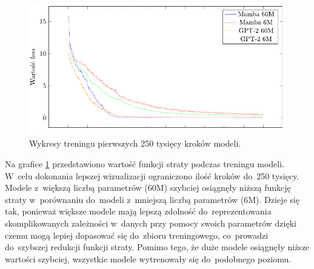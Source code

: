 \documentclass[data-science]{agh-wi} %
\begin{document}
\begin{figure}[ht!]
    \centering
    \includegraphics[width=0.9\linewidth]{./img/training_plot.pdf}
    \caption{Wykresy treningu pierwszych 250 tysięcy kroków modeli.}\label{fig:midi_train}
\end{figure}

Na grafice \ref*{fig:midi_train} przedstawiono wartość funkcji straty podczas treningu modeli. W~celu dokonania lepszej wizualizacji ograniczono ilość kroków do~250 tysięcy. Modele z~większą liczbą parametrów (60M) szybciej osiągnęły niższą funkcję straty w~porównaniu do~modeli z~mniejszą liczbą parametrów (6M). Dzieje się tak, ponieważ większe modele mają lepszą zdolność do~reprezentowania skomplikowanych zależności w~danych przy pomocy swoich parametrów dzięki czemu mogą lepiej dopasować się do~zbioru treningowego, co~prowadzi do~szybszej redukcji funkcji straty. Pomimo tego, że duże modele osiągnęły niższe wartości szybciej, wszystkie modele wytrenowały się do~podobnego poziomu.
\end{document}
